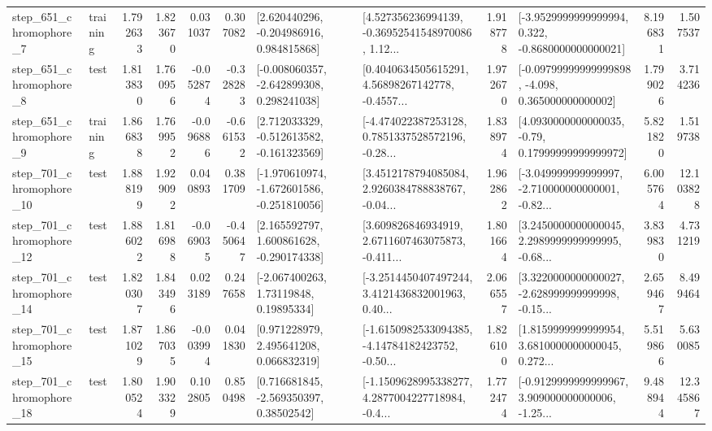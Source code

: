 \begin{tabular}{llrrrrllrlrr}
   step\_651\_chromophore\_7 &  training &      1.792633 &    1.823670 &      0.031037 &  0.307082 &    [2.620440296, -0.204986916, 0.984815868] &  [4.527356236994139, -0.36952541548970086, 1.12... &       1.918778 &  [-3.9529999999999994, 0.322, -0.8680000000000021] &            8.196831 &          1.507537 \\
   step\_651\_chromophore\_8 &      test &      1.813830 &    1.760956 &     -0.052874 & -0.328283 &   [-0.008060357, -2.642899308, 0.298241038] &  [0.4040634505615291, 4.56898267142778, -0.4557... &       1.972670 &  [-0.09799999999999898, -4.098, 0.365000000000002] &            1.799026 &          3.714236 \\
   step\_651\_chromophore\_9 &  training &      1.866838 &    1.769952 &     -0.096886 & -0.661532 &   [2.712033329, -0.512613582, -0.161323569] &  [-4.474022387253128, 0.7851337528572196, -0.28... &       1.838974 &   [4.0930000000000035, -0.79, 0.17999999999999972] &            5.821820 &          1.519738 \\
  step\_701\_chromophore\_10 &      test &      1.888199 &    1.929092 &      0.040893 &  0.381709 &  [-1.970610974, -1.672601586, -0.251810056] &  [3.4512178794085084, 2.9260384788838767, -0.04... &       1.962862 &  [-3.049999999999997, -2.710000000000001, -0.82... &            6.005764 &         12.103828 \\
  step\_701\_chromophore\_12 &      test &      1.886022 &    1.816988 &     -0.069035 & -0.450647 &    [2.165592797, 1.600861628, -0.290174338] &  [3.609826846934919, 2.6711607463075873, -0.411... &       1.801664 &  [3.2450000000000045, 2.2989999999999995, -0.68... &            3.839830 &          4.731219 \\
  step\_701\_chromophore\_14 &      test &      1.820307 &    1.843496 &      0.023189 &  0.247658 &      [-2.067400263, 1.73119848, 0.19895334] &  [-3.2514450407497244, 3.4121436832001963, 0.40... &       2.066557 &  [3.3220000000000027, -2.628999999999998, -0.15... &            2.659467 &          8.499464 \\
  step\_701\_chromophore\_15 &      test &      1.871029 &    1.867035 &     -0.003994 &  0.041830 &     [0.971228979, 2.495641208, 0.066832319] &  [-1.6150982533094385, -4.14784182423752, -0.50... &       1.826100 &  [1.8159999999999954, 3.6810000000000045, 0.272... &            5.519866 &          5.630085 \\
  step\_701\_chromophore\_18 &      test &      1.800524 &    1.903329 &      0.102805 &  0.850498 &     [0.716681845, -2.569350397, 0.38502542] &  [-1.1509628995338277, 4.2877004227718984, -0.4... &       1.772474 &  [-0.9129999999999967, 3.909000000000006, -1.25... &            9.488944 &         12.345867 \\

\end{tabular}
